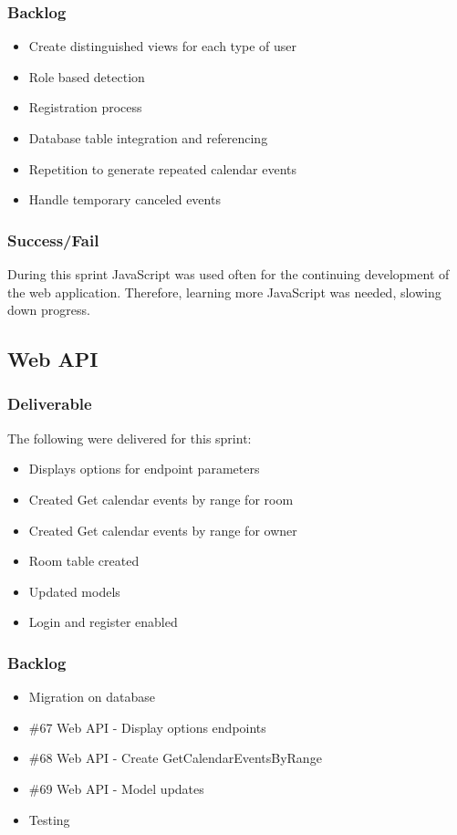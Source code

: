 \subsubsection{Backlog}
\begin{itemize}
\item Create distinguished views for each type of user
\item Role based detection
\item Registration process
\item Database table integration and referencing
\item Repetition to generate repeated calendar events
\item Handle temporary canceled events
\end{itemize}

\subsubsection{Success/Fail}
During this sprint JavaScript was used often for the continuing development of the web application. Therefore, learning more JavaScript was needed, slowing down progress.

\subsection{Web API}
\subsubsection{Deliverable}
The following were delivered for this sprint:
\begin{itemize}
\item Displays options for endpoint parameters
\item Created Get calendar events by range for room
\item Created Get calendar events by range for owner
\item Room table created
\item Updated models
\item Login and register enabled
\end{itemize}

\subsubsection{Backlog}
\begin{itemize}
\item Migration on database
\item \#67 Web API - Display options endpoints
\item \#68 Web API - Create GetCalendarEventsByRange
\item \#69 Web API - Model updates
\item Testing
\end{itemize}

